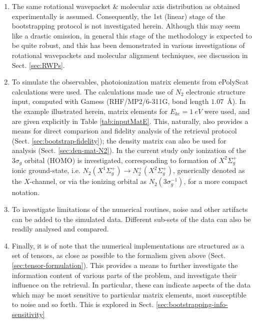 \documentclass[10pt]{article}
\begin{document}
\begin{enumerate}
\item The same rotational wavepacket \& molecular axis distribution as obtained experimentally is assumed. Consequently, the 1st (linear) stage of the bootstrapping protocol is not investigated herein. Although this may seem like a drastic omission, in general this stage of the methodology is expected to be quite robust, and this has been demonstrated in various investigations of rotational wavepackets and molecular alignment techniques, see discussion in Sect. \ref{sec:RWPs}.
\item To simulate the observables, photoionization matrix elements from ePolyScat \cite{Lucchese1986, Gianturco1994, Natalense1999, luccheseEPolyScatUserManual} calculations were used. The calculations made use of $N_2$ electronic structure input, computed with Gamess \cite{gamess, Gordon} (RHF/MP2/6-311G, bond length $1.07$~\AA). In the example illustrated herein, matrix elements for $E_{ke}=1~eV$ were used, and are given explicitly in Table \ref{tab:inputMatE}. This, naturally, also provides a means for direct comparison and fidelity analysis of the retrieval protocol (Sect. \ref{sec:bootstrap-fidelity}); the density matrix can also be used for analysis (Sect. \ref{sec:den-mat-N2}). In the current study only ionization of the $3\sigma_g$ orbital (HOMO) is investigated, corresponding to formation of  $X^2\Sigma_{g}^{+}$ ionic ground-state, i.e. $N_2(X^{1}\Sigma^{+}_{g}) \rightarrow N^+_2(X^{2}\Sigma^{+}_{g})$, generically denoted as the $X$-channel, or via the ionizing orbital as $N_2(3\sigma_g^{-1})$, for a more compact notation. 
\item To investigate limitations of the numerical routines, noise and other artifacts can be added to the simulated data. Different sub-sets of the data can also be readily analysed and compared.
\item Finally, it is of note that the numerical implementations are structured as a set of tensors, as close as possible to the formalism given above (Sect. \ref{sec:tensor-formulation}). This provides a means to further investigate the information content of various parts of the problem, and investigate their influence on the retrieval. In particular, these can indicate aspects of the data which may be most sensitive to particular matrix elements, most susceptible to noise and so forth. This is explored in Sect. \ref{sec:bootstrapping-info-sensitivity}
\end{enumerate}
\end{document}
